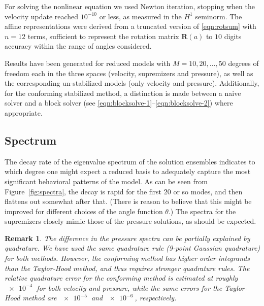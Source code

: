 \documentclass[onecolumn, twoside, a4paper, 11pt]{article}
\newtheorem{remark}{Remark}
\begin{document}
For solving the nonlinear equation we used Newton iteration, stopping when the
velocity update reached $10^{-10}$ or less, as measured in the $H^1$ seminorm.
The affine representations were derived from a truncated version of
\eqref{eqn:rotsum} with $n=12$ terms, sufficient to represent the rotation
matrix $\bm R(a)$ to $10$ digits accuracy within the range of angles considered.

Results have been generated for reduced models with $M=10,20,\ldots,50$ degrees
of freedom each in the three spaces (velocity, supremizers and pressure), as
well as the corresponding un-stabilized models (only velocity and pressure).
Additionally, for the conforming stabilized method, a distinction is made
between a naive solver and a block solver (see
\eqref{eqn:blocksolve-1}--\eqref{eqn:blocksolve-2}) where appropriate.

\subsection{Spectrum}

The decay rate of the eigenvalue spectrum of the solution ensembles indicates to which degree one
might expect a reduced basis to adequately capture the most significant behavioral patterns of the
model. As can be seen from Figure~\ref{fig:spectra}, the decay is rapid for the first $20$ or so
modes, and then flattens out somewhat after that. (There is reason to believe that this might be
improved for different choices of the angle function $\theta$.) The spectra for the supremizers
closely mimic those of the pressure solutions, as should be expected.

\begin{remark}
  The difference in the pressure spectra can be partially explained by quadrature. We have used the
  same quadrature rule (9-point Gaussian quadrature) for both methods. However, the conforming
  method has higher order integrands than the Taylor-Hood method, and thus requires stronger
  quadrature rules. The relative quadrature error for the conforming method is estimated at roughly
  $\SI{e-4}{}$ for both velocity and pressure, while the same errors for the Taylor-Hood method are
  $\SI{e-5}{}$ and $\SI{e-6}{}$, respectively.
\end{remark}
\end{document}
